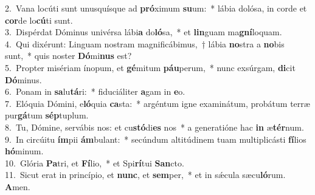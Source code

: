 {2.~}Vana locúti sunt unusquísque ad \textbf{pró}ximum \textbf{su}um:~* lábia dolósa, in corde et \textbf{cor}de lo\textbf{cú}ti sunt.\\
{3.~}Dispérdat Dóminus univérsa lábi\textbf{a} do\textbf{ló}sa,~* et \textbf{lin}guam ma\textbf{gní}loquam.\\
{4.~}Qui dixérunt: Linguam nostram magnificábimus,~† lábia \textbf{no}stra a \textbf{no}bis sunt,~* quis noster \textbf{Dó}mi\textbf{nus} est?\\
{5.~}Propter misériam ínopum, et \textbf{gé}mitum \textbf{páu}perum,~* nunc exsúrgam, \textbf{di}cit \textbf{Dó}minus.\\
{6.~}Ponam in \textbf{sa}lu\textbf{tá}ri:~* fiduciáliter \textbf{a}gam in \textbf{e}o.\\
{7.~}Elóquia Dómini, e\textbf{ló}quia \textbf{ca}sta:~* argéntum igne examinátum, probátum terræ pur\textbf{gá}tum \textbf{sép}tuplum.\\
{8.~}Tu, Dómine, servábis nos: et cu\textbf{stó}di\textbf{es} nos~* a generatióne hac \textbf{in} æ\textbf{tér}num.\\
{9.~}In circúitu \textbf{ím}pii \textbf{ám}bulant:~* secúndum altitúdinem tuam multiplicásti \textbf{fí}lios \textbf{hó}minum.\\
{10.~}Glória \textbf{Pa}tri, et \textbf{Fí}lio,~* et Spi\textbf{rí}tui \textbf{San}cto.\\
{11.~}Sicut erat in princípio, et \textbf{nunc}, et \textbf{sem}per,~* et in sǽcula sæcu\textbf{ló}rum. \textbf{A}men.\\
